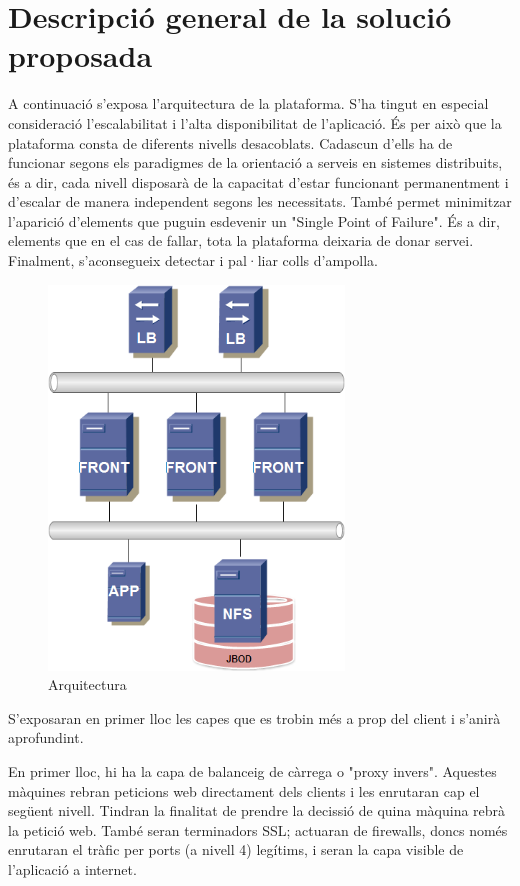 \section{Descripció general de la solució proposada}

A continuació s'exposa l'arquitectura de la plataforma. S'ha tingut en especial consideració l'escalabilitat i l'alta disponibilitat de l'aplicació. És per això que la plataforma consta de diferents nivells desacoblats. Cadascun d'ells ha de funcionar segons els paradigmes de la orientació a serveis en sistemes distribuits, és a dir, cada nivell disposarà de la capacitat d'estar funcionant permanentment i d'escalar de manera independent segons les necessitats. 
També permet minimitzar l'aparició d'elements que puguin esdevenir un "Single Point of Failure". És a dir, elements que en el cas de fallar, tota la plataforma deixaria de donar servei. Finalment, s’aconsegueix detectar i pal·liar colls d'ampolla.

\begin{figure}[H]
    \centering
    \includegraphics[width=0.7\textwidth]{IM}
    \caption{Arquitectura \label{fig:arquitect}}    
\end{figure}

S'exposaran en primer lloc les capes que es trobin més a prop del client i s'anirà aprofundint.

En primer lloc, hi ha la capa de balanceig de càrrega o "proxy invers". Aquestes màquines rebran peticions web directament dels clients i les enrutaran cap el següent nivell. Tindran la finalitat de prendre la decissió de quina màquina rebrà la petició web. També seran terminadors SSL; actuaran de firewalls, doncs només enrutaran el tràfic per ports (a nivell 4) legítims, i seran la capa visible de l'aplicació a internet.


